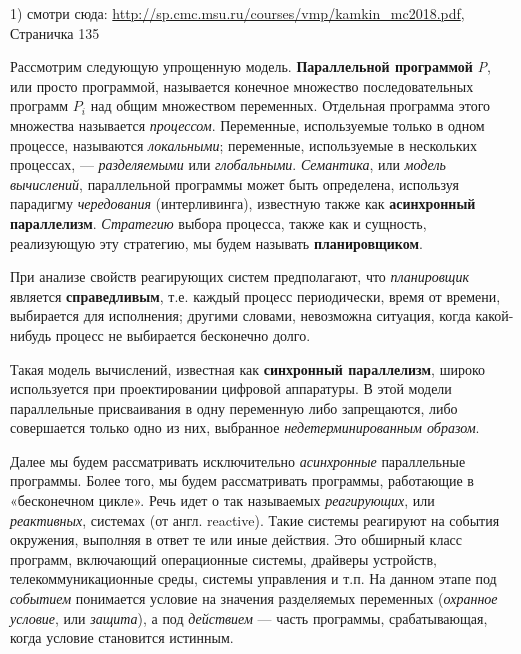 
1) смотри сюда: \url{http://sp.cmc.msu.ru/courses/vmp/kamkin_mc2018.pdf}, 
Страничка 135

Рассмотрим следующую упрощенную модель.
\textbf{Параллельной программой} \textit{P}, или просто программой, называется конечное множество последовательных программ \textit{$P_i$} над общим множеством переменных. 
Отдельная программа этого множества называется \textit{процессом}.
Переменные, используемые только в одном процессе, называются \textit{локальными}; переменные, используемые в нескольких процессах, — \textit{разделяемыми} или \textit{глобальными}.
\textit{Семантика}, или \textit{модель вычислений}, параллельной программы может быть определена, используя парадигму \textit{чередования} (интерливинга), известную также как \textbf{асинхронный параллелизм}. 
\textit{Стратегию} выбора процесса, также как и сущность, реализующую эту стратегию, мы будем называть \textbf{планировщиком}. 

При анализе свойств реагирующих систем предполагают, что \textit{планировщик} является \textbf{справедливым}, т.е. каждый процесс периодически, время от времени, выбирается для исполнения; другими словами, невозможна ситуация, когда какой-нибудь процесс не выбирается бесконечно долго.

Такая модель вычислений, известная как \textbf{синхронный параллелизм}, широко используется при проектировании цифровой аппаратуры. 
В этой модели параллельные присваивания в одну переменную либо запрещаются, либо совершается только одно из них, выбранное \textit{недетерминированным образом}.

Далее мы будем рассматривать исключительно \textit{асинхронные} параллельные программы. 
Более того, мы будем рассматривать программы, работающие в «бесконечном цикле». 
Речь идет о так называемых \textit{реагирующих}, или \textit{реактивных}, системах (от англ. reactive). 
Такие системы реагируют на события окружения, выполняя в ответ те или иные действия. 
Это обширный класс программ, включающий операционные системы, драйверы устройств, телекоммуникационные среды, системы управления и т.п.
На данном этапе под \textit{событием} понимается условие на значения разделяемых переменных (\textit{охранное условие}, или \textit{защита}), а под \textit{действием} — часть программы, срабатывающая, когда условие становится истинным. 


